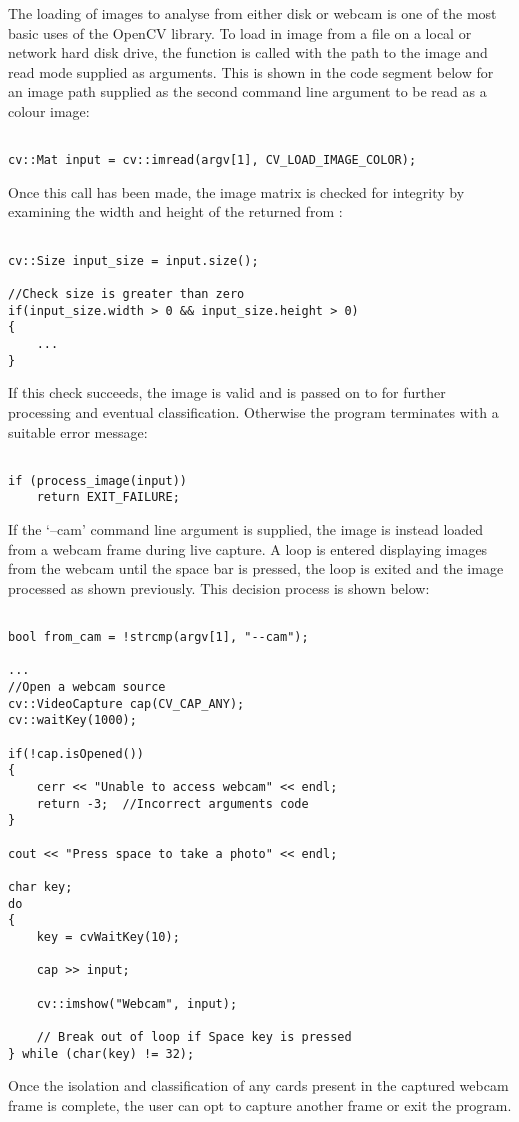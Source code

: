 		The loading of images to analyse from either disk or webcam is one of the most basic uses of the OpenCV library. To load in image from a file on a local or network hard disk drive, the  function is called with the path to the image and read mode supplied as arguments. This is shown in the code segment below for an image path supplied as the second command line argument to be read as a colour image:

		\begin{lstlisting}

cv::Mat input = cv::imread(argv[1], CV_LOAD_IMAGE_COLOR);
		\end{lstlisting}

		Once this call has been made, the image matrix is checked for integrity by examining the width and height of the  returned from :

		\begin{lstlisting}

cv::Size input_size = input.size();

//Check size is greater than zero
if(input_size.width > 0 && input_size.height > 0)
{
	...
}
		\end{lstlisting}

		If this check succeeds, the image is valid and is passed on to  for further processing and eventual classification. Otherwise the program terminates with a suitable error message:
		
		\begin{lstlisting}

if (process_image(input))
	return EXIT_FAILURE;
		\end{lstlisting}

		If the `--cam' command line argument is supplied, the image is instead loaded from a webcam frame during live capture. A loop is entered displaying images from the webcam until the space bar is pressed, the loop is exited and the image processed as shown previously. This decision process is shown below:

		\begin{lstlisting}

bool from_cam = !strcmp(argv[1], "--cam");

...
//Open a webcam source
cv::VideoCapture cap(CV_CAP_ANY);
cv::waitKey(1000);

if(!cap.isOpened())
{
	cerr << "Unable to access webcam" << endl;
	return -3;  //Incorrect arguments code
}

cout << "Press space to take a photo" << endl;

char key;
do
{
	key = cvWaitKey(10);

	cap >> input;

	cv::imshow("Webcam", input);

	// Break out of loop if Space key is pressed
} while (char(key) != 32);
		\end{lstlisting}

		Once the isolation and classification of any cards present in the captured webcam frame is complete, the user can opt to capture another frame or exit the program.